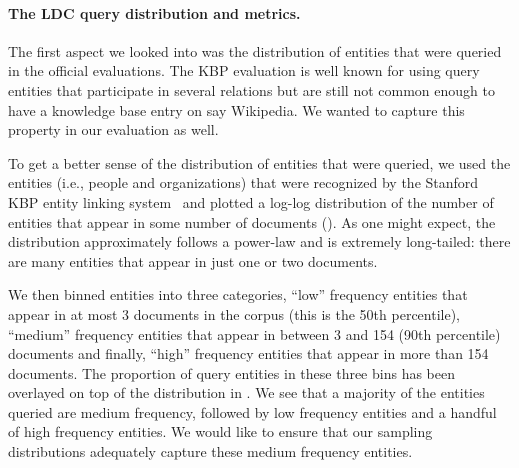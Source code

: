 \paragraph{The LDC query distribution and metrics.}
The first aspect we looked into was the distribution of entities that were queried in the official evaluations. 
The KBP evaluation is well known for using query entities that participate in several relations but are still not common enough to have a knowledge base entry on say Wikipedia.
We wanted to capture this property in our evaluation as well.

To get a better sense of the distribution of entities that were queried, we used the entities (i.e., people and organizations) that were recognized by the Stanford KBP entity linking system~\citet{stanford2017kbp} and plotted a log-log distribution of the number of entities that appear in some number of documents ().
As one might expect, the distribution approximately follows a power-law and is extremely long-tailed: there are many entities that appear in just one or two documents. 

We then binned entities into three categories, ``low'' frequency entities that appear in at most 3 documents in the corpus (this is the 50th percentile), ``medium'' frequency entities that appear in between 3 and 154 (90th percentile) documents and finally, ``high'' frequency entities that appear in more than 154 documents.
The proportion of query entities in these three bins has been overlayed on top of the distribution in .
We see that a majority of the entities queried are medium frequency, followed by low frequency entities and a handful of high frequency entities.
We would like to ensure that our sampling distributions adequately capture these medium frequency entities. 


